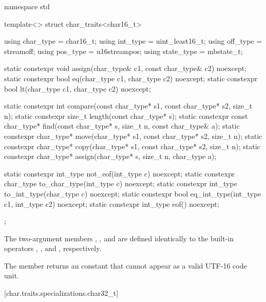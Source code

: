 %
\begin{codeblock}
namespace std {
  template<> struct char_traits<char16_t> {
    using char_type  = char16_t;
    using int_type   = uint_least16_t;
    using off_type   = streamoff;
    using pos_type   = u16streampos;
    using state_type = mbstate_t;

    static constexpr void assign(char_type& c1, const char_type& c2) noexcept;
    static constexpr bool eq(char_type c1, char_type c2) noexcept;
    static constexpr bool lt(char_type c1, char_type c2) noexcept;

    static constexpr int compare(const char_type* s1, const char_type* s2, size_t n);
    static constexpr size_t length(const char_type* s);
    static constexpr const char_type* find(const char_type* s, size_t n,
                                           const char_type& a);
    static constexpr char_type* move(char_type* s1, const char_type* s2, size_t n);
    static constexpr char_type* copy(char_type* s1, const char_type* s2, size_t n);
    static constexpr char_type* assign(char_type* s, size_t n, char_type a);

    static constexpr int_type not_eof(int_type c) noexcept;
    static constexpr char_type to_char_type(int_type c) noexcept;
    static constexpr int_type to_int_type(char_type c) noexcept;
    static constexpr bool eq_int_type(int_type c1, int_type c2) noexcept;
    static constexpr int_type eof() noexcept;
  };
}
\end{codeblock}


\pnum
The two-argument members ,
, and  are defined identically to
the built-in operators \tcode{=}, \tcode{==}, and
\tcode{<}, respectively.

\pnum
The member  returns an
 constant that cannot appear
as a valid UTF-16 code unit.

[char.traits.specializations.char32_t]{}

